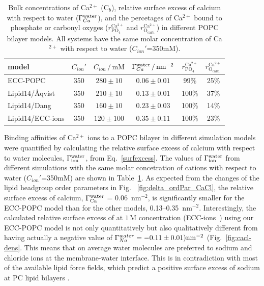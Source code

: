 \begin{table}[tb!] 
  \caption{Bulk concentrations of Ca$^{2+}$ (C$_b$), relative surface excess of calcium with respect to water ($\Gamma_{Ca}^{\rm water}$), 
    and the percetages of Ca$^{2+}$ bound to phosphate or carbonyl oxyges ($r^\mathrm{Ca^{2+}} _\mathrm{PO_4} $ and $r^\mathrm{Ca^{2+}} _\mathrm{O_{carb.}}$) 
    in different POPC bilayer models. All systems have the same molar concentration of Ca$^{2+}$ with respect to water ($C_{ion}'$=350mM). 
  \label{tab:binding}} 
  \begin{tabular}{l|c c | c | c c} 
    model                  & $C_{ion}'$ & $C_{ion}\,/\,\mathrm{mM}$ & $\Gamma_{Ca}^{\rm water} \,/\, \mathrm{nm}^{-2}$  & $r^\mathrm{Ca^{2+}} _\mathrm{PO_4} $ & $r^\mathrm{Ca^{2+}} _\mathrm{O_{carb.}} $ \\ 
    \hline 
    ECC-POPC             &  350  &  $280\pm 10 $  &  $0.06 \pm 0.01 $                           &  99\%  &    25\%    \\ 
    Lipid14/Åqvist     &  350  &  $210\pm 10 $  &  $0.13 \pm 0.01 $                          & 100\%  &    37\%     \\ 
    Lipid14/Dang           &  350  &  $160\pm 10 $  &  $0.23 \pm 0.03 $                            & 100\%  &    14\%    \\ 
    Lipid14/ECC-ions       &  350  &  $120\pm 100$  &  $0.35 \pm 0.11 $                         & 100\%  &    23\%    \\ 
  \end{tabular} 
\end{table} 
 
Binding affinities of Ca$^{2+}$ ions to a POPC bilayer in different simulation models were quantified by calculating the relative surface excess of calcium with respect to water molecules, $\Gamma_{\rm ion}^{\rm water}$, from Eq.~\ref{surfexcess}. 
The values of $\Gamma_{\rm ion}^{\rm water}$ 
from different simulations with the same molar concetration of cations with respect 
to water ($C_{ion}'$=350mM) are shown in Table~\ref{tab:binding}. 
As expected from the changes of the lipid headgroup order parameters in Fig.~ \ref{fig:delta_ordPar_CaCl}, the relative surface excess of calcium, $\Gamma_{\rm Ca}^{\rm water}$ = 0.06~nm$^{-2}$, is significantly smaller for the ECC-POPC model than for the other models, 0.13--0.35~nm$^{-2}$. 
Interestingly, the calculated relative surface excess of  at $1\,\mathrm{M}$ concentration (ECC-ions~\citep{Pluharova2014}) using our ECC-POPC model is not only quantitatively but also qualitatively different from  having actually a negative value of $\Gamma_{Na}^{water} = -0.11 \pm 0.01) \rm{nm}^{-2}$ (Fig.~\ref{fig:cacl-dens}. This  
means that on average water molecules are preferred to sodium and chloride ions at the membrane-water interface.   
This is in contradiction with most of the available lipid force fields, which predict a positive surface excess of sodium at PC lipid bilayers \citep{catte16}. 
 
